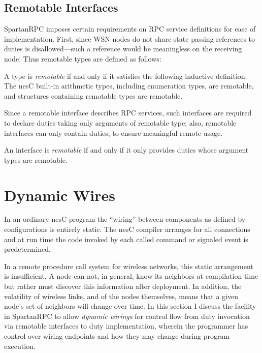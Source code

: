 \subsection{Remotable Interfaces}
\label{section-remotable}

SpartanRPC imposes certain requirements on RPC service definitions for ease of implementation.
First, since WSN nodes do not share state passing references to duties is disallowed---such a
reference would be meaningless on the receiving node. Thus remotable types are defined as
follows:
\begin{definition}A type is \emph{remotable} if and only if it satisfies the following inductive
  definition: The nesC built-in arithmetic types, including enumeration types, are remotable,
  and structures containing remotable types are remotable.
\end{definition}
Since a remotable interface describes RPC services, such interfaces are required to declare
duties taking only arguments of remotable type; also, remotable interfaces can only contain
duties, to ensure meaningful remote usage.
\begin{definition}
  An interface is \emph{remotable} if and only if it only provides duties whose argument types
  are remotable.
\end{definition}

\section{Dynamic Wires}
\label{section-dynamic-wires}

In an ordinary nesC program the ``wiring'' between components as defined by configurations is
entirely static. The nesC compiler arranges for all connections and at run time the code invoked
by each called command or signaled event is predetermined.

In a remote procedure call system for wireless networks, this static arrangement is
insufficient. A node can not, in general, know its neighbors at compilation time but rather must
discover this information after deployment. In addition, the volatility of wireless links, and
of the nodes themselves, means that a given node's set of neighbors will change over time. In
this section I discuss the facility in SpartanRPC to allow \emph{dynamic wirings} for control
flow from duty invocation via remotable interfaces to duty implementation, wherein the
programmer has control over wiring endpoints and how they may change during program execution.

